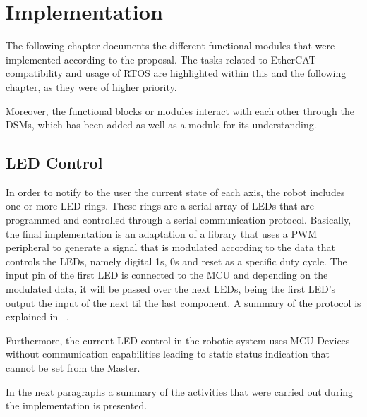 \chapter{Implementation}\label{cha:implementation}
The following chapter documents the different functional modules that were implemented according to the proposal. 
The tasks related to EtherCAT compatibility and usage of RTOS are highlighted within this and the following chapter,
 as they were of higher priority.

Moreover, the functional blocks or modules interact with each other through the DSMs, which has been added as well 
as a module for its understanding.

\section{LED Control}\label{sec:leds}


In order to notify to the user the current state of each axis, the robot includes one or more LED rings. These rings are 
 a serial array of LEDs that are programmed and controlled through a serial communication protocol. Basically, the final implementation
 is an adaptation of a library that uses a PWM peripheral to generate a signal that is modulated according to the data that 
 controls the LEDs, namely digital 1s, 0s and reset as a specific duty cycle. The input pin of the first LED is connected to the MCU and depending on the modulated data, it will be 
 passed over the next LEDs, being the first LED's output the input of the next til the last component. A summary of the 
 protocol is explained in ~\cite{led_protocol}. 

Furthermore, the current LED control in the robotic system uses MCU Devices without communication capabilities leading to 
static status indication that cannot be set from the Master.

 In the next paragraphs a summary of the activities that were carried out during the implementation is presented.

